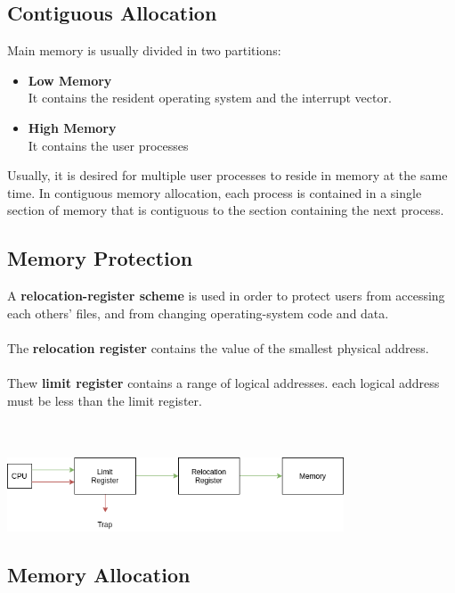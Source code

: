 \documentclass{article}
\begin{document}
\subsection{Contiguous Allocation}
Main memory is usually divided in two partitions:

\begin{itemize}
	\item \textbf{Low Memory}
	\vspace{.2cm} \\
	It contains the resident operating system and the interrupt vector.
	
	\item \textbf{High Memory}
	\vspace{.2cm} \\
	It contains the user processes
\end{itemize}
Usually, it is desired for multiple user processes to reside in memory at the same time. In contiguous memory allocation, each process is contained in a single section of memory that is contiguous to the section containing the next process.

\subsection{Memory Protection}
A \textbf{relocation-register scheme} is used in order to protect users from accessing each others' files, and from changing operating-system code and data. \\ \\
The \textbf{relocation register} contains the value of the smallest physical address. \\ \\
Thew \textbf{limit register} contains a range of logical addresses. each logical address must be less than the limit register. \\ \\ \\

\centerline{\includegraphics[width=10cm]{./assets/mem-protection.png}}

\subsection{Memory Allocation}
\end{document}

